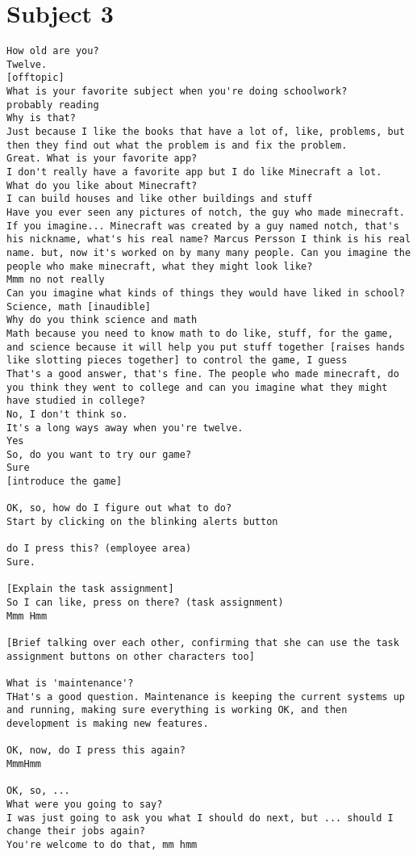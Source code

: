 \clearpage\section*{Subject 3}
\begin{lstlisting}
How old are you?
Twelve.
[offtopic]
What is your favorite subject when you're doing schoolwork?
probably reading
Why is that?
Just because I like the books that have a lot of, like, problems, but then they find out what the problem is and fix the problem.
Great. What is your favorite app?
I don't really have a favorite app but I do like Minecraft a lot.
What do you like about Minecraft?
I can build houses and like other buildings and stuff
Have you ever seen any pictures of notch, the guy who made minecraft.
If you imagine... Minecraft was created by a guy named notch, that's his nickname, what's his real name? Marcus Persson I think is his real name. but, now it's worked on by many many people. Can you imagine the people who make minecraft, what they might look like?
Mmm no not really
Can you imagine what kinds of things they would have liked in school?
Science, math [inaudible]
Why do you think science and math
Math because you need to know math to do like, stuff, for the game, and science because it will help you put stuff together [raises hands like slotting pieces together] to control the game, I guess
That's a good answer, that's fine. The people who made minecraft, do you think they went to college and can you imagine what they might have studied in college?
No, I don't think so.
It's a long ways away when you're twelve.
Yes
So, do you want to try our game?
Sure
[introduce the game]

OK, so, how do I figure out what to do?
Start by clicking on the blinking alerts button

do I press this? (employee area)
Sure.

[Explain the task assignment]
So I can like, press on there? (task assignment)
Mmm Hmm

[Brief talking over each other, confirming that she can use the task assignment buttons on other characters too]

What is 'maintenance'?
THat's a good question. Maintenance is keeping the current systems up and running, making sure everything is working OK, and then development is making new features.

OK, now, do I press this again?
MmmHmm

OK, so, ...
What were you going to say?
I was just going to ask you what I should do next, but ... should I change their jobs again?
You're welcome to do that, mm hmm


\end{lstlisting}
